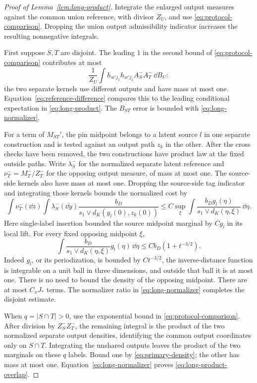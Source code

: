 \begin{proof}[Proof of Lemma~\ref{lem:long-product}]
Integrate the enlarged output measures against the common union
reference, with divisor $Z_U$, and use
\eqref{eq:protocol-comparison}.  Dropping the union output
admissibility indicator increases the resulting nonnegative
integrals.

First suppose $S,T$ are disjoint.  The leading $1$ in the second
bound of \eqref{eq:protocol-comparison} contributes at most
\[
 \frac1{Z_U}\int h_{w'j_1}h_{w'j_2}A_S^-A_T^-\,\dd B_U:
\]
the two separate kernels use different outputs and have mass at
most one.  Equation~\eqref{eq:reference-difference} compares this
to the leading conditional expectation in
\eqref{eq:long-product}.  The $B_{ST}$ error is bounded with
\eqref{eq:long-normalizer}.

For a term of $M_{ST}'$, the pin midpoint belongs to a latent
source $l$ in one separate construction and is tested against an
output path $z_k$ in the other.  After the cross checks have been removed,
the two constructions have product law at the fixed outside paths.
Write $\lambda_S^-$ for the normalized separate latent reference
and $\nu_T^-=M_T^-/Z_T^-$ for the opposing output measure, of mass
at most one.  The source-side kernels also have mass at most one.
Dropping the source-side tag indicator and integrating those kernels bounds
the normalized cost by
\[
 \int \nu_T^-(\dd z)\int\lambda_S^-(\dd y)
   \frac{b_D}{s_1\vee d_K(y_l(0),z_k(0))}
 \le C\sup_{\xi}\int
   \frac{b_Dg_l(\eta)}{s_1\vee d_K(\eta,\xi)}\,\dd\eta.
\]
Here single-label insertion bounded the source midpoint marginal
by $Cg_l$ in its local lift.  For every fixed opposing midpoint
$\xi$,
\begin{equation}\label{eq:pin-cost-average}
 \int \frac{b_D}{s_1\vee d_K(\eta,\xi)}g_l(\eta)\,\dd\eta
          \le Cb_D(1+t^{-3/2}).
\end{equation}
Indeed $g_l$, or its periodization, is bounded by $Ct^{-3/2}$,
the inverse-distance function is integrable on a unit ball in
three dimensions, and outside that ball it is at most one.
There is no need to bound the density of the opposing midpoint.
There are at most $C_xJ_*$ terms.  The normalizer ratio in
\eqref{eq:long-normalizer} completes the disjoint estimate.

When $q=|S\cap T|>0$, use the exponential bound in
\eqref{eq:protocol-comparison}.  After division by $Z_S^-Z_T^-$,
the remaining integral is the product of the two normalized
separate output densities, identifying the common output
coordinates only on $S\cap T$.  Integrating the unshared outputs
leaves the product of the two marginals on these $q$ labels.
Bound one by \eqref{eq:primary-density}; the other has mass at
most one.  Equation~\eqref{eq:long-normalizer} proves
\eqref{eq:long-product-overlap}.


\end{proof}
